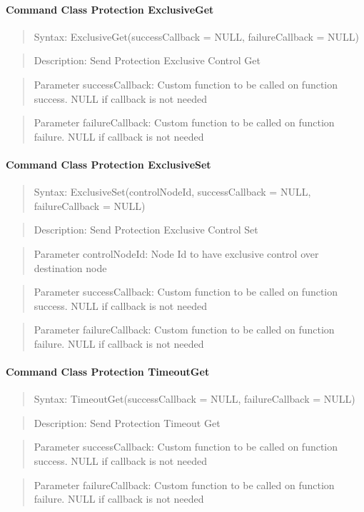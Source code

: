 \paragraph {Command Class Protection ExclusiveGet}
\begin{quote} Syntax: ExclusiveGet(successCallback = NULL, failureCallback = NULL)\end{quote}
\begin{quote} Description: Send Protection Exclusive Control Get\end{quote}
\begin{quote} Parameter successCallback: Custom function to be called on function success. NULL if callback is not needed\end{quote}
\begin{quote} Parameter failureCallback: Custom function to be called on function failure. NULL if callback is not needed\end{quote}

\paragraph {Command Class Protection ExclusiveSet}
\begin{quote} Syntax: ExclusiveSet(controlNodeId, successCallback = NULL, failureCallback = NULL)\end{quote}
\begin{quote} Description: Send Protection Exclusive Control Set\end{quote}
\begin{quote} Parameter controlNodeId: Node Id to have exclusive control over destination node\end{quote}
\begin{quote} Parameter successCallback: Custom function to be called on function success. NULL if callback is not needed\end{quote}
\begin{quote} Parameter failureCallback: Custom function to be called on function failure. NULL if callback is not needed\end{quote}

\paragraph {Command Class Protection TimeoutGet}
\begin{quote} Syntax: TimeoutGet(successCallback = NULL, failureCallback = NULL)\end{quote}
\begin{quote} Description: Send Protection Timeout Get\end{quote}
\begin{quote} Parameter successCallback: Custom function to be called on function success. NULL if callback is not needed\end{quote}
\begin{quote} Parameter failureCallback: Custom function to be called on function failure. NULL if callback is not needed\end{quote}

